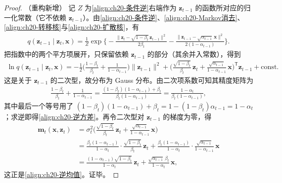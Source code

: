 \documentclass[../../main.tex]{subfiles}
\begin{document}
\begin{proof}（重构新增）
记 $Z$ 为\eqref{align:ch20-条件逆}右端作为 $\bm{z}_{t-1}$ 的函数所对应的归一化常数（它不依赖 $\bm{z}_{t-1}$）。由\eqref{align:ch20-条件逆}、\eqref{align:ch20-Markov消去}、\eqref{align:ch20-转移核}与\eqref{align:ch20-扩散核}，有
\begin{align*}
q(\bm{z}_{t-1}\mid\bm{z}_t,\bm{x})=\frac{1}{Z}\exp\Big\{-\frac{\|\bm{z}_t-\sqrt{1-\beta_t}\,\bm{z}_{t-1}\|^2}{2\beta_t}-\frac{\|\bm{z}_{t-1}-\sqrt{\alpha_{t-1}}\,\bm{x}\|^2}{2(1-\alpha_{t-1})}\Big\}.
\end{align*}
把指数中的两个平方项展开，只保留依赖 $\bm{z}_{t-1}$ 的部分（其余并入常数），得到
\begin{align*}
\ln q(\bm{z}_{t-1}\mid\bm{z}_t,\bm{x})=-\frac{1}{2}\Big(\frac{1-\beta_t}{\beta_t}+\frac{1}{1-\alpha_{t-1}}\Big)\|\bm{z}_{t-1}\|^2+\Big(\frac{\sqrt{1-\beta_t}}{\beta_t}\,\bm{z}_t+\frac{\sqrt{\alpha_{t-1}}}{1-\alpha_{t-1}}\,\bm{x}\Big)^{\!\mathsf T}\bm{z}_{t-1}+\mathrm{const}.
\end{align*}
这是关于 $\bm{z}_{t-1}$ 的二次型，故分布为 Gauss 分布。由二次项系数可知其精度矩阵为
\begin{align*}
\frac{1-\beta_t}{\beta_t}+\frac{1}{1-\alpha_{t-1}}=\frac{(1-\beta_t)(1-\alpha_{t-1})+\beta_t}{\beta_t(1-\alpha_{t-1})}=\frac{1-\alpha_t}{\beta_t(1-\alpha_{t-1})},
\end{align*}
其中最后一个等号用了 $(1-\beta_t)(1-\alpha_{t-1})+\beta_t=1-(1-\beta_t)\alpha_{t-1}=1-\alpha_t$；求逆即得\eqref{align:ch20-逆方差}。再令二次型对 $\bm{z}_{t-1}$ 的梯度为零，得
\begin{align*}
\bm{m}_t(\bm{x},\bm{z}_t)&=\sigma_t^2\Big(\frac{\sqrt{1-\beta_t}}{\beta_t}\,\bm{z}_t+\frac{\sqrt{\alpha_{t-1}}}{1-\alpha_{t-1}}\,\bm{x}\Big)\\
&=\frac{\beta_t(1-\alpha_{t-1})}{1-\alpha_t}\cdot\frac{\sqrt{1-\beta_t}}{\beta_t}\,\bm{z}_t+\frac{\beta_t(1-\alpha_{t-1})}{1-\alpha_t}\cdot\frac{\sqrt{\alpha_{t-1}}}{1-\alpha_{t-1}}\,\bm{x}\\
&=\frac{(1-\alpha_{t-1})\sqrt{1-\beta_t}}{1-\alpha_t}\,\bm{z}_t+\frac{\sqrt{\alpha_{t-1}}\,\beta_t}{1-\alpha_t}\,\bm{x},
\end{align*}
这正是\eqref{align:ch20-逆均值}。证毕。
\end{proof}
\end{document}
